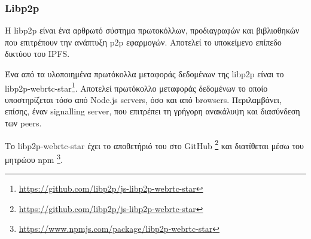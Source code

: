 \subsubsection{Libp2p} \label{subsection:4-2-4-3-libp2p}


Η libp2p είναι ένα αρθρωτό σύστημα πρωτοκόλλων, προδιαγραφών και βιβλιοθηκών που επιτρέπουν την ανάπτυξη p2p εφαρμογών. Αποτελεί το υποκείμενο επίπεδο δικτύου του IPFS.\cite{2.7-ipfs-docs}

Ένα από τα υλοποιημένα πρωτόκολλα μεταφοράς δεδομένων της libp2p είναι το libp2p-webrtc-star\footnote{\url{https://github.com/libp2p/js-libp2p-webrtc-star}}. Αποτελεί πρωτόκολλο μεταφοράς δεδομένων το οποίο υποστηρίζεται τόσο από Node.js servers, όσο και από browsers. Περιλαμβάνει, επίσης, έναν signalling server, που επιτρέπει τη γρήγορη ανακάλυψη και διασύνδεση των peers.

Το libp2p-webrtc-star έχει το αποθετήριό του στο GitHub \footnote{\url{https://github.com/libp2p/js-libp2p-webrtc-star}} και διατίθεται μέσω του μητρώου npm \footnote{\url{https://www.npmjs.com/package/libp2p-webrtc-star}}.
